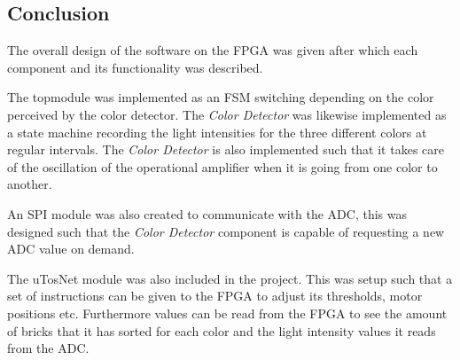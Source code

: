 
\subsection{Conclusion}
The overall design of the software on the FPGA was given after which each component and its functionality was described.

The topmodule was implemented as an FSM switching depending on the color perceived by the color detector.
The \textit{Color Detector} was likewise implemented as a state machine recording the light intensities for the three different colors at regular intervals.
The \textit{Color Detector} is also implemented such that it takes care of the oscillation of the operational amplifier when it is going from one color to another.

An SPI module was also created to communicate with the ADC, this was designed such that the \textit{Color Detector} component is capable of requesting a new ADC value on demand.

The uTosNet module was also included in the project.
This was setup such that a set of instructions can be given to the FPGA to adjust its thresholds, motor positions etc. 
Furthermore values can be read from the FPGA to see the amount of bricks that it has sorted for each color and the light intensity values it reads from the ADC.